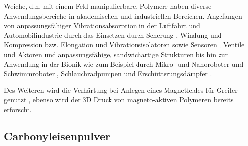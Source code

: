 Weiche, d.h. mit einem Feld manipulierbare, Polymere haben diverse Anwendungsbereiche in akademischen und industriellen Bereichen. Angefangen von anpassungsfähiger Vibrationsabsorption in der Luftfahrt und Automobilindustrie durch das Einsetzen durch Scherung \cite{Ginder_Schlotter_Nichols,Deng_Gong}, Windung \cite{Hoang_Zhang_Li_Du} und Kompression bzw. Elongation \cite{Kallio_2007} und Vibrationsisolatoren \cite{Ginder_2000} sowie Sensoren \cite{Ginder_2000,Martin_2006}, Ventile und Aktoren \cite{Boese_2012,Keip_2014} und anpassungsfähige, sandwichartige Strukturen \cite{Zhou_2005,Zhou_2006,Wei_2008} bis hin zur Anwendung in der Bionik wie zum Beispiel durch Mikro- und Nanoroboter und Schwimmroboter \cite{Qiu_2015,Xu_2015,Lum_2016,Hu_2018}, Schlauchradpumpen \cite{Fuhrer_2013} und Erschütterungsdämpfer \cite{Li_2013}.

Des Weiteren wird die Verhärtung bei Anlegen eines Magnetfeldes für Greifer genutzt \cite{Qi_2020}, ebenso wird der 3D Druck von magneto-aktiven Polymeren \cite{Sindersberger_2018} bereits erforscht.

%

\subsection{Carbonyleisenpulver} \label{cip}


